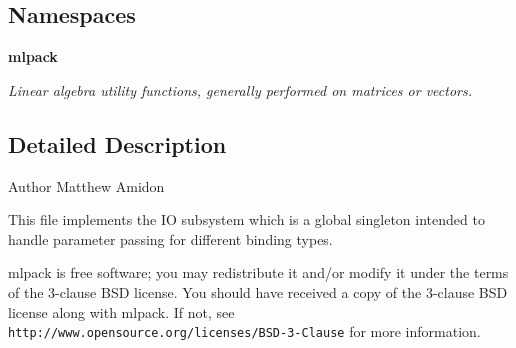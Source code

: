 \subsection*{Namespaces}
\begin{DoxyCompactItemize}
\item 
 \textbf{ mlpack}
\begin{DoxyCompactList}\small\item\em Linear algebra utility functions, generally performed on matrices or vectors. \end{DoxyCompactList}\end{DoxyCompactItemize}


\subsection{Detailed Description}
\begin{DoxyAuthor}{Author}
Matthew Amidon
\end{DoxyAuthor}
This file implements the IO subsystem which is a global singleton intended to handle parameter passing for different binding types.

mlpack is free software; you may redistribute it and/or modify it under the terms of the 3-\/clause B\+SD license. You should have received a copy of the 3-\/clause B\+SD license along with mlpack. If not, see {\tt http\+://www.\+opensource.\+org/licenses/\+B\+S\+D-\/3-\/\+Clause} for more information. 